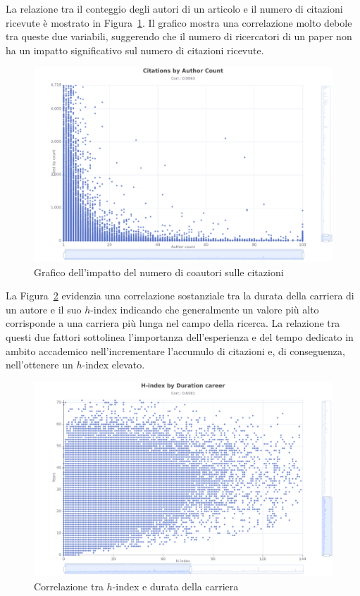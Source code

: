 La relazione tra il conteggio degli autori di un articolo e il numero di citazioni ricevute è mostrato in Figura~\ref{fig:Citations-by-Author-Count}. Il grafico mostra una correlazione molto debole  tra queste due variabili, suggerendo che il numero di ricercatori di un paper non ha un impatto significativo sul numero di citazioni ricevute.

\begin{figure}[ht]
    \centering
    \includegraphics[width=.7\textwidth]{images/Citations-by-Author-Count.pdf}
    \caption{Grafico dell'impatto del numero di coautori sulle citazioni}
    \label{fig:Citations-by-Author-Count}
\end{figure}

La Figura~\ref{fig:H-index-by-Duration-career} evidenzia una correlazione sostanziale tra la durata della carriera di un autore e il suo $h$-index indicando che generalmente un valore più alto corrisponde a una carriera più lunga nel campo della ricerca. La relazione tra questi due fattori sottolinea l'importanza dell'esperienza e del tempo dedicato in ambito accademico nell'incrementare l'accumulo di citazioni e, di conseguenza, nell'ottenere un $h$-index elevato.

\begin{figure}[ht]
    \centering
    \includegraphics[width=.7\textwidth]{images/H-index-by-Duration-career.pdf}
    \caption{Correlazione tra $h$-index e durata della carriera}
    \label{fig:H-index-by-Duration-career}
\end{figure}


